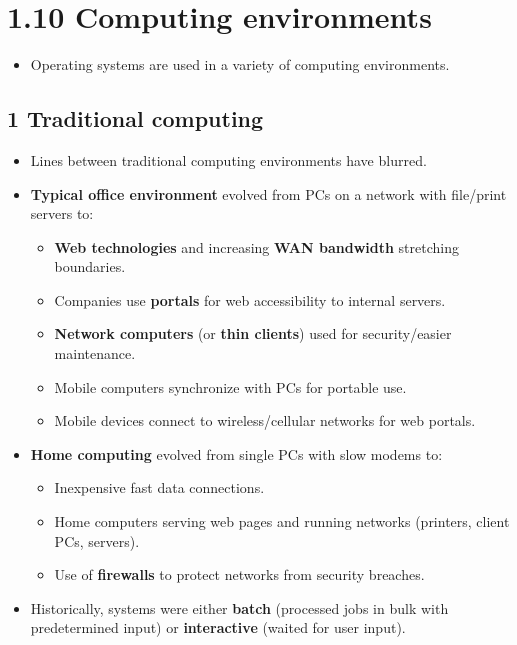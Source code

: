 \documentclass{article}
\begin{document}
\section*{1.10 Computing environments}
\begin{itemize}
    \item Operating systems are used in a variety of computing environments.
\end{itemize}

\subsection*{1 Traditional computing}
\begin{itemize}
    \item Lines between traditional computing environments have blurred.
    \item \textbf{Typical office environment} evolved from PCs on a network with file/print servers to:
    \begin{itemize}
        \item \textbf{Web technologies} and increasing \textbf{WAN bandwidth} stretching boundaries.
        \item Companies use \textbf{portals} for web accessibility to internal servers.
        \item \textbf{Network computers} (or \textbf{thin clients}) used for security/easier maintenance.
        \item Mobile computers synchronize with PCs for portable use.
        \item Mobile devices connect to wireless/cellular networks for web portals.
    \end{itemize}
    \item \textbf{Home computing} evolved from single PCs with slow modems to:
    \begin{itemize}
        \item Inexpensive fast data connections.
        \item Home computers serving web pages and running networks (printers, client PCs, servers).
        \item Use of \textbf{firewalls} to protect networks from security breaches.
    \end{itemize}
    \item Historically, systems were either \textbf{batch} (processed jobs in bulk with predetermined input) or \textbf{interactive} (waited for user input).

\end{itemize}
\end{document}
